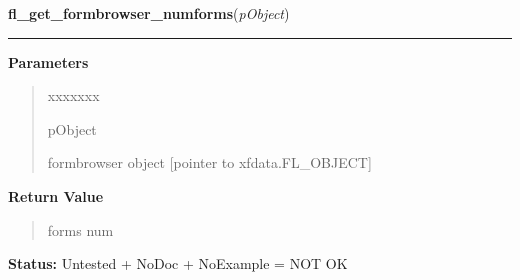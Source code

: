     \label{xformslib:library:fl_get_formbrowser_numforms}

    \vspace{0.5ex}

\hspace{.8\funcindent}\begin{boxedminipage}{\funcwidth}

    \raggedright \textbf{fl\_get\_formbrowser\_numforms}(\textit{pObject})

    \vspace{-1.5ex}

    \rule{\textwidth}{0.5\fboxrule}
\setlength{\parskip}{2ex}
\setlength{\parskip}{1ex}
      \textbf{Parameters}
      \vspace{-1ex}

      \begin{quote}
        \begin{Ventry}{xxxxxxx}

          \item[pObject]

          formbrowser object [pointer to xfdata.FL\_OBJECT]

        \end{Ventry}

      \end{quote}

      \textbf{Return Value}
    \vspace{-1ex}

      \begin{quote}
      forms num

      \end{quote}

\textbf{Status:} Untested + NoDoc + NoExample = NOT OK



    \end{boxedminipage}

    \label{xformslib:library:fl_get_formbrowser_form}

    \vspace{0.5ex}


